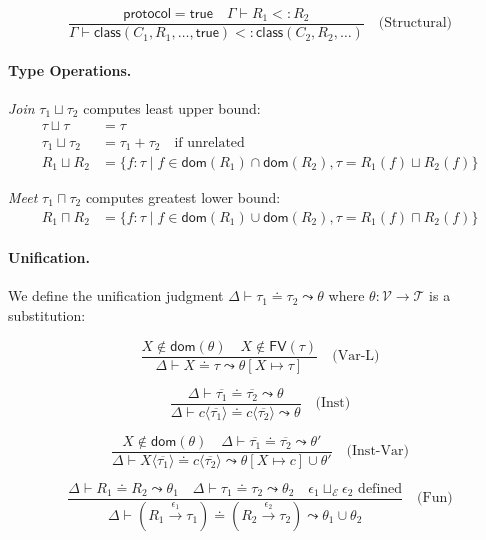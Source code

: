 \[
\frac{\mathsf{protocol} = \mathsf{true} \quad \Gamma \vdash R_1 <: R_2}{\Gamma \vdash \mathsf{class}(C_1, R_1, \ldots, \mathsf{true}) <: \mathsf{class}(C_2, R_2, \ldots)} \quad \text{(Structural)}
\]

\paragraph{Type Operations.}

\emph{Join} $\tau_1 \sqcup \tau_2$ computes least upper bound:
\[
\begin{aligned}
\tau \sqcup \tau &= \tau \\
\tau_1 \sqcup \tau_2 &= \tau_1 + \tau_2 \quad \text{if unrelated} \\
R_1 \sqcup R_2 &= \{f : \tau \mid f \in \mathsf{dom}(R_1) \cap \mathsf{dom}(R_2), \tau = R_1(f) \sqcup R_2(f)\}
\end{aligned}
\]

\emph{Meet} $\tau_1 \sqcap \tau_2$ computes greatest lower bound:
\[
\begin{aligned}
R_1 \sqcap R_2 &= \{f : \tau \mid f \in \mathsf{dom}(R_1) \cup \mathsf{dom}(R_2), \tau = R_1(f) \sqcap R_2(f)\}
\end{aligned}
\]

\paragraph{Unification.} We define the unification judgment $\Delta \vdash \tau_1 \doteq \tau_2 \leadsto \theta$ where $\theta : \mathcal{V} \to \mathcal{T}$ is a substitution:

\[
\frac{X \notin \mathsf{dom}(\theta) \quad X \notin \mathsf{FV}(\tau)}{\Delta \vdash X \doteq \tau \leadsto \theta[X \mapsto \tau]} \quad \text{(Var-L)}
\]

\[
\frac{\Delta \vdash \overline{\tau_1} \doteq \overline{\tau_2} \leadsto \theta}{\Delta \vdash c\langle\overline{\tau_1}\rangle \doteq c\langle\overline{\tau_2}\rangle \leadsto \theta} \quad \text{(Inst)}
\]

\[
\frac{X \notin \mathsf{dom}(\theta) \quad \Delta \vdash \overline{\tau_1} \doteq \overline{\tau_2} \leadsto \theta'}{\Delta \vdash X\langle\overline{\tau_1}\rangle \doteq c\langle\overline{\tau_2}\rangle \leadsto \theta[X \mapsto c] \cup \theta'} \quad \text{(Inst-Var)}
\]

\[
\frac{\Delta \vdash R_1 \doteq R_2 \leadsto \theta_1 \quad \Delta \vdash \tau_1 \doteq \tau_2 \leadsto \theta_2 \quad \epsilon_1 \sqcup_\mathcal{E} \epsilon_2 \text{ defined}}{\Delta \vdash (R_1 \xrightarrow{\epsilon_1} \tau_1) \doteq (R_2 \xrightarrow{\epsilon_2} \tau_2) \leadsto \theta_1 \cup \theta_2} \quad \text{(Fun)}
\]

